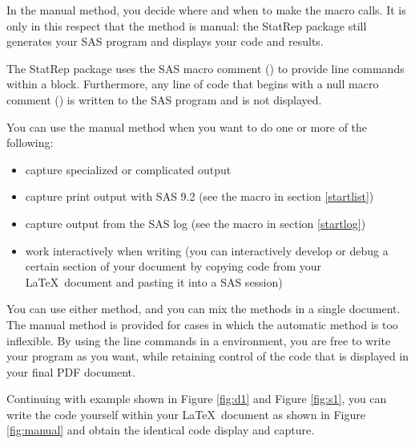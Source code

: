 \documentclass[article,oneside]{memoir}
\newcommand*{\StatRep}{\textsf{StatRep}\xspace}
\begin{document}
In the manual method, you decide where and when to make the macro calls.
It is only in this respect that the method is manual: the
\StatRep package still generates your SAS program and displays your code and results.

The \StatRep package uses
  the SAS macro comment () to provide line
  commands within a 
  block. Furthermore, any line of code that begins with a null macro
  comment (\Code{\%*;})
  is written to the SAS program and is not displayed.

You can use the manual method when you want to do one or more of the following:
\begin{itemize}
\item capture specialized or complicated output
\item capture print output with SAS 9.2 (see the  macro in section \ref{startlist})
\item capture output from the SAS log (see the  macro in section \ref{startlog})
\item work interactively when writing (you can interactively develop or debug a
        certain section of your document by copying code from
        your \LaTeX\ document and pasting it into a SAS session)
\end{itemize}

 You can use either method, and you can
mix the methods in a single document. The manual method is provided for cases in which the
automatic method is too inflexible. By using the line commands in a  environment,
you are free to write your program as you want, while retaining control of the code that is
displayed in your final PDF document.

  Continuing with example shown in Figure \ref{fig:d1} and Figure \ref{fig:s1},
  you can write the code yourself within your
  \LaTeX\ document as shown in Figure \ref{fig:manual}
  and obtain the identical code display and capture.
\end{document}

